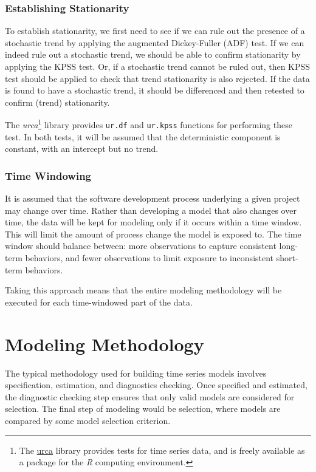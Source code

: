 \documentclass[a4paper]{scrartcl}
\begin{document}
\subsubsection*{Establishing Stationarity}
To establish stationarity, we first need to see if we can rule out the presence of a stochastic trend by applying the augmented Dickey-Fuller (ADF) test. If we can indeed rule out a stochastic trend, we should be able to confirm stationarity by applying the KPSS test. Or, if a stochastic trend cannot be ruled out, then KPSS test should be applied to check that trend stationarity is also rejected. If the data is found to have a stochastic trend, it should be differenced and then retested to confirm (trend) stationarity.

The \textit{urca}\footnote{The \href{http://cran.r-project.org/web/packages/urca}{urca} library provides tests for time series data, and is freely available as a package for the \textit{R} computing environment.} library provides \texttt{ur.df} and \texttt{ur.kpss} functions for performing these test. In both tests, it will be assumed that the deterministic component is constant, with an intercept but no trend.

\subsubsection*{Time Windowing}
It is assumed that the software development process underlying a given project may change over time. Rather than developing a model that also changes over time, the data will be kept for modeling only if it occurs within a time window. This will limit the amount of process change the model is exposed to. The time window should balance between: more observations to capture consistent long-term behaviors, and fewer observations to limit exposure to inconsistent short-term behaviors.

Taking this approach means that the entire modeling methodology will be executed for each time-windowed part of the data. 

\section*{Modeling Methodology}
\label{sec:modeling_methodology}

The typical methodology used for building time series models involves specification, estimation, and diagnostics checking\cite[p. 478]{box_jenkins_reinsel_2008}. Once specified and estimated, the diagnostic checking step ensures that only valid models are considered for selection. The final step of modeling would be selection, where models are compared by some model selection criterion\cite[pg. 581]{box_jenkins_reinsel_2008}.
\end{document}

